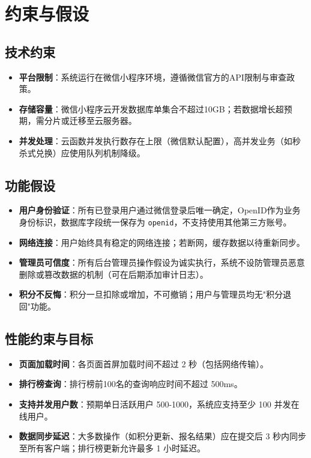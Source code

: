 \documentclass[a4paper,12pt]{article}
\begin{document}
\section{约束与假设}

\subsection{技术约束}
\begin{itemize}
    \item \textbf{平台限制}：系统运行在微信小程序环境，遵循微信官方的API限制与审查政策。
    \item \textbf{存储容量}：微信小程序云开发数据库单集合不超过10GB；若数据增长超预期，需分片或迁移至云服务器。
    \item \textbf{并发处理}：云函数并发执行数存在上限（微信默认配置），高并发业务（如秒杀式兑换）应使用队列机制降级。
\end{itemize}

\subsection{功能假设}
\begin{itemize}
    \item \textbf{用户身份验证}：所有已登录用户通过微信登录后唯一确定，OpenID作为业务身份标识，数据库字段统一保存为 \texttt{openid}，不支持使用其他第三方账号。
    \item \textbf{网络连接}：用户始终具有稳定的网络连接；若断网，缓存数据以待重新同步。
    \item \textbf{管理员可信度}：所有后台管理员操作假设为诚实执行，系统不设防管理员恶意删除或篡改数据的机制（可在后期添加审计日志）。
    \item \textbf{积分不反悔}：积分一旦扣除或增加，不可撤销；用户与管理员均无"积分退回"功能。
\end{itemize}

\subsection{性能约束与目标}
\begin{itemize}
    \item \textbf{页面加载时间}：各页面首屏加载时间不超过 2 秒（包括网络传输）。
    \item \textbf{排行榜查询}：排行榜前100名的查询响应时间不超过 500ms。
    \item \textbf{支持并发用户数}：预期单日活跃用户 500-1000，系统应支持至少 100 并发在线用户。
    \item \textbf{数据同步延迟}：大多数操作（如积分更新、报名结果）应在提交后 3 秒内同步至所有客户端；排行榜更新允许最多 1 小时延迟。
\end{itemize}
\end{document}
